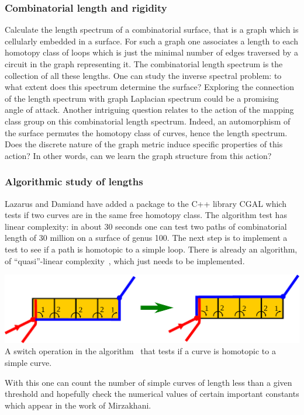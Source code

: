 \documentclass[14pt,fleqn]{article}
\begin{document}
\subsubsection{Combinatorial length and rigidity}
 Calculate the length
spectrum of a combinatorial surface, that is a graph which is
cellularly embedded in a surface.  For such a graph one associates a
length to each homotopy class of loops which is just the minimal
number of edges traversed by a circuit in the graph representing
it. The combinatorial length spectrum is the collection of all these
lengths. One can study the inverse spectral problem: to what extent
does this spectrum determine the surface? Exploring the connection of the length spectrum with graph Laplacian spectrum could be a promising angle of attack. Another intriguing question relates to the action of the mapping class group on this combinatorial length spectrum. Indeed, an automorphism of the
 surface permutes the homotopy class of curves, hence the length spectrum. Does the discrete nature of the graph metric induce specific properties of this action? In other words, can we learn the graph structure from this action?

\subsubsection{Algorithmic study of lengths}

Lazarus and Damiand have
added a package to the C++ library  CGAL which tests if two curves are
in the same free homotopy class. The algorithm test has linear
complexity: in about 30 seconds one can test two paths of
combinatorial length of 30 million on a surface of genus
100. The next step is to implement a test to see if a path
is homotopic to a simple loop. There is already an algorithm, of
“quasi”-linear complexity~\cite{dl-cginc-19}, which just needs to be implemented.
\begin{center}
  \includegraphics[scale=.55]{switch.pdf} \\
  {\small A switch operation in the algorithm~\cite{dl-cginc-19} that tests if a curve is homotopic to a simple curve.}
\end{center}
With
this one can count the number of simple curves of length less than a given threshold 
and hopefully check the numerical values of certain important constants which
appear in the work of Mirzakhani.
\end{document}
